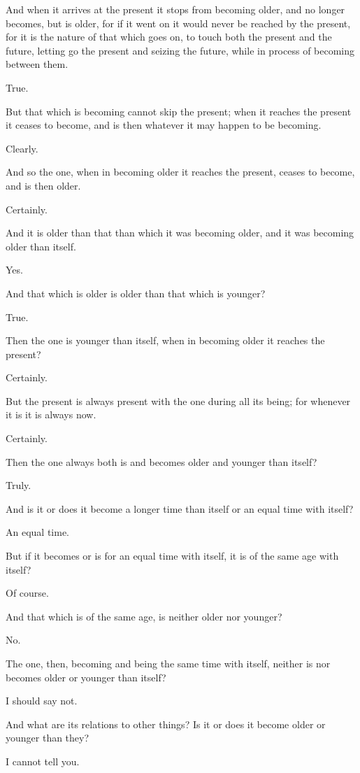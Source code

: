 And when it arrives at the present it stops from becoming older, and
no longer becomes, but is older, for if it went on it would never be
reached by the present, for it is the nature of that which goes on,
to touch both the present and the future, letting go the present and
seizing the future, while in process of becoming between them.

True.

But that which is becoming cannot skip the present; when it reaches the
present it ceases to become, and is then whatever it may happen to be
becoming.

Clearly.

And so the one, when in becoming older it reaches the present, ceases to
become, and is then older.

Certainly.

And it is older than that than which it was becoming older, and it was
becoming older than itself.

Yes.

And that which is older is older than that which is younger?

True.

Then the one is younger than itself, when in becoming older it reaches
the present?

Certainly.

But the present is always present with the one during all its being; for
whenever it is it is always now.

Certainly.

Then the one always both is and becomes older and younger than itself?

Truly.

And is it or does it become a longer time than itself or an equal time
with itself?

An equal time.

But if it becomes or is for an equal time with itself, it is of the same
age with itself?

Of course.

And that which is of the same age, is neither older nor younger?

No.

The one, then, becoming and being the same time with itself, neither is
nor becomes older or younger than itself?

I should say not.

And what are its relations to other things? Is it or does it become
older or younger than they?

I cannot tell you.

